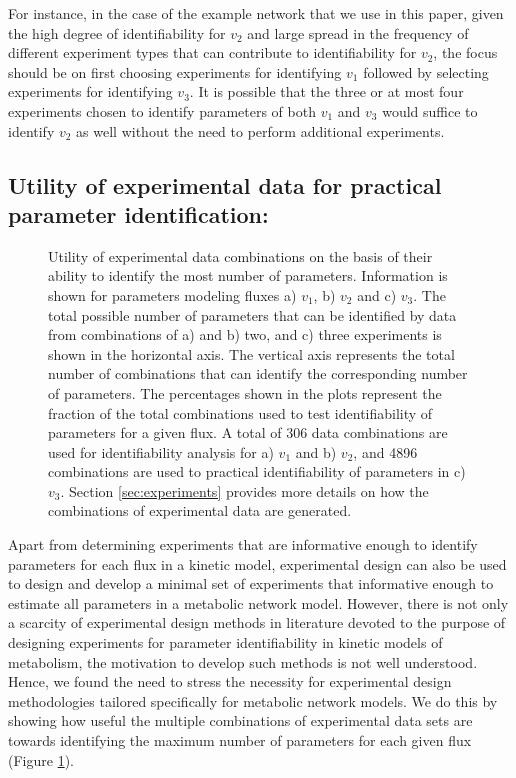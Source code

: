 \documentclass[10pt]{article}
\begin{document}
For instance, in the case of the example network that we use in this paper, given the high degree of identifiability for $v_2$ and large spread in the frequency of different experiment types that can contribute to identifiability for $v_2$, the focus should be on first choosing experiments for identifying $v_1$ followed by selecting experiments for identifying $v_3$. It is possible that the three or at most four experiments chosen to identify parameters of both $v_1$ and $v_3$ would suffice to identify $v_2$ as well without the need to perform additional experiments.

\subsection{Utility of experimental data for practical parameter identification:}\label{sec:data_utility}
\begin{figure}[!tbhp]
	\caption{Utility of experimental data combinations on the basis of their ability to identify the most number of parameters. Information is shown for parameters modeling fluxes a) $v_1$, b) $v_2$ and c) $v_3$. The total possible number of parameters that can be identified by data from combinations of a) and b) two, and c) three experiments is shown in the horizontal axis. The vertical axis represents the total number of combinations that can identify the corresponding number of parameters. The percentages shown in the plots represent the fraction of the total combinations used to test identifiability of parameters for a given flux. A total of 306 data combinations are used for identifiability analysis for a) $v_1$ and b) $v_2$, and 4896 combinations are used to practical identifiability of parameters in c)$v_3$. Section \ref{sec:experiments} provides more details on how the combinations of experimental data are generated.}\label{fig:figure4}
\end{figure}

Apart from determining experiments that are informative enough to identify parameters for each flux in a kinetic model, experimental design can also be used to design and develop a minimal set of experiments that informative enough to estimate all parameters in a metabolic network model. However, there is not only a scarcity of experimental design methods in literature devoted to the purpose of designing experiments for parameter identifiability in kinetic models of metabolism, the motivation to develop such methods is not well understood. Hence, we found the need to stress the necessity for experimental design methodologies tailored specifically for metabolic network models. We do this by showing how useful the multiple combinations of experimental data sets are towards identifying the maximum number of parameters for each given flux (Figure \ref{fig:figure4}).
\end{document}
